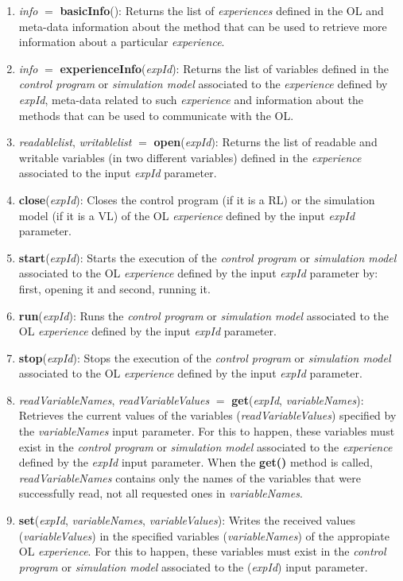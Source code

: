 \begin{enumerate}
    \item \textit{info}  $=$ \textbf{basicInfo}(): Returns the list of \textit{experiences} defined in the OL and meta-data information about the method that can be used to retrieve more information about a particular \textit{experience}.
    \item \textit{info}  $=$ \textbf{experienceInfo}(\textit{expId}): Returns the list of variables defined in the \textit{control program} or \textit{simulation model} associated to the \textit{experience} defined by \textit{expId}, meta-data related to such \textit{experience} and information about the methods that can be used to communicate with the OL.
    \item \textit{readablelist}, \textit{writablelist}  $=$ \textbf{open}(\textit{expId}): Returns the list of readable and writable variables (in two different variables) defined in the \textit{experience} associated to the input \textit{expId} parameter.
    \item \textbf{close}(\textit{expId}): Closes the control program (if it is a RL) or the simulation model (if it is a VL) of the OL \textit{experience} defined by the input \textit{expId} parameter.
    \item \textbf{start}(\textit{expId}): Starts the execution of the \textit{control program} or \textit{simulation model} associated to the OL \textit{experience} defined by the input \textit{expId} parameter by: first, opening it and second, running it.
    \item \textbf{run}(\textit{expId}): Runs the \textit{control program} or \textit{simulation model} associated to the OL \textit{experience} defined by the input \textit{expId} parameter.
    \item \textbf{stop}(\textit{expId}): Stops the execution of the \textit{control program} or \textit{simulation model} associated to the OL \textit{experience} defined by the input \textit{expId} parameter.
    \item \textit{readVariableNames}, \textit{readVariableValues} $=$ \textbf{get}(\textit{expId}, \textit{variableNames}): Retrieves the current values of the variables (\textit{readVariableValues}) specified by the \textit{variableNames} input parameter. For this to happen, these variables must exist in the \textit{control program} or \textit{simulation model} associated to the \textit{experience} defined by the \textit{expId} input parameter. When the \textbf{get()} method is called, \textit{readVariableNames} contains only the names of the variables that were successfully read, not all requested ones in \textit{variableNames}.
    \item \textbf{set}(\textit{expId}, \textit{variableNames}, \textit{variableValues}): Writes the received values (\textit{variableValues}) in the specified variables (\textit{variableNames}) of the appropiate OL \textit{experience}. For this to happen, these variables must exist in the \textit{control program} or \textit{simulation model} associated to the (\textit{expId}) input parameter.
\end{enumerate}

